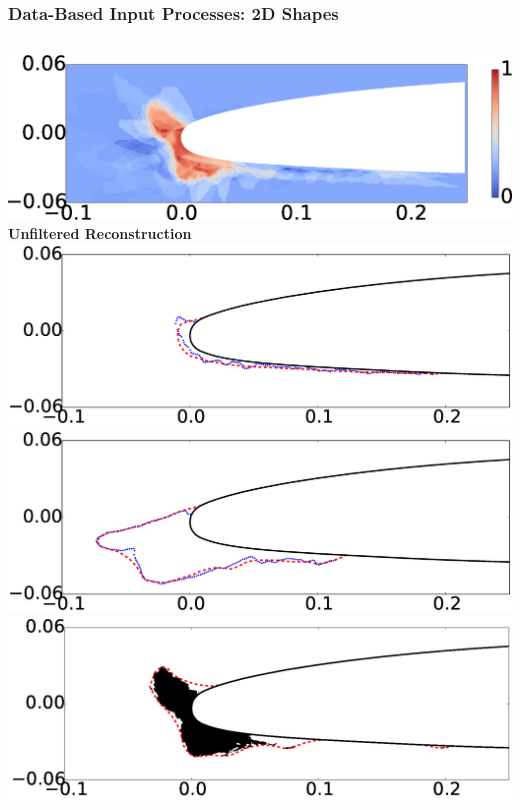 \documentclass[9pt]{beamer}
\begin{document}
\begin{frame}
\frametitle{Data-Based Input Processes: 2D Shapes}
\label{sec-2-7}


\begin{columns}[c]
    \centering
    \hspace{-0.5em}
    \includegraphics[width=1\textwidth]{UnfilteredReconstruction.png} \\
    {\bf Unfiltered Reconstruction} \\
    \includegraphics[width=1\textwidth]{ReconstructionE1} \\
    \includegraphics[width=1\textwidth]{ReconstructionE9} \\
    \centering
    \includegraphics[width=1\textwidth]{FilteredReconstruction.png} \\

\end{columns}
\end{frame}
\end{document}
